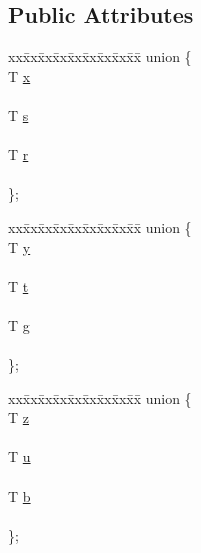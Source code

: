 \subsection*{Public Attributes}
\begin{DoxyCompactItemize}
\item 
\begin{tabbing}
xx\=xx\=xx\=xx\=xx\=xx\=xx\=xx\=xx\=\kill
union \{\\
\>T \hyperlink{class_vector3_a1a0f7e168c71ca798099f0ba8a444244}{x}\\
\>\\
\>T \hyperlink{class_vector3_a152ee26cfc844e014925dc4bb31d10b0}{s}\\
\>\\
\>T \hyperlink{class_vector3_add6ab48cc3cc8636e4f043caa8824dff}{r}\\
\>\\
\}; \\

\end{tabbing}\item 
\begin{tabbing}
xx\=xx\=xx\=xx\=xx\=xx\=xx\=xx\=xx\=\kill
union \{\\
\>T \hyperlink{class_vector3_a561df88b28e106e337a25bb86554a569}{y}\\
\>\\
\>T \hyperlink{class_vector3_a4543c81991a56da65f37a0bba1695c32}{t}\\
\>\\
\>T \hyperlink{class_vector3_a2cd87f1cae37ddde9a1bc91acfba4b7c}{g}\\
\>\\
\}; \\

\end{tabbing}\item 
\begin{tabbing}
xx\=xx\=xx\=xx\=xx\=xx\=xx\=xx\=xx\=\kill
union \{\\
\>T \hyperlink{class_vector3_ab3e7f5401dd6e951978bfa746809f74f}{z}\\
\>\\
\>T \hyperlink{class_vector3_aca1ce49fc91888da09306f222ff43756}{u}\\
\>\\
\>T \hyperlink{class_vector3_a5d0fb92a571771b1611e15e0daeb4826}{b}\\
\>\\
\}; \\

\end{tabbing}\end{DoxyCompactItemize}
